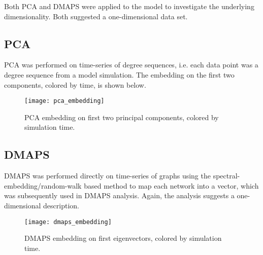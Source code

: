 \documentclass[11pt]{article}
\begin{document}
Both PCA and DMAPS were applied to the model to investigate the underlying dimensionality. Both suggested a one-dimensional data set.

\subsection{PCA}

PCA was performed on time-series of degree sequences, i.e. each data point was a degree sequence from a model simulation. The embedding on the first two components, colored by time, is shown below.

\begin{figure}[!h]
  \texttt{[image: pca\_embedding]}
  \caption{PCA embedding on first two principal components, colored by simulation time.}
\end{figure}

\subsection{DMAPS}

DMAPS was performed directly on time-series of graphs using the spectral-embedding/random-walk based method to map each network into a vector, which was subsequently used in DMAPS analysis. Again, the analysis suggests a one-dimensional description.

\begin{figure}[!h]
  \texttt{[image: dmaps\_embedding]}
  \caption{DMAPS embedding on first eigenvectors, colored by simulation time.}
\end{figure}
\end{document}
